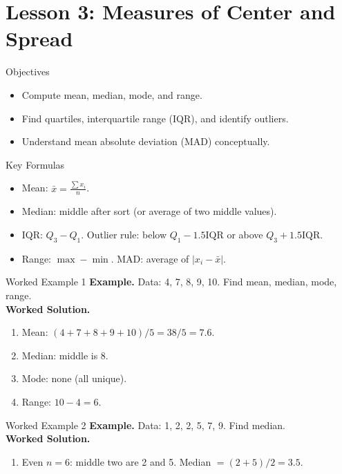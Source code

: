 \documentclass[aspectratio=169]{beamer}
\newcommand{\exampletitle}[1]{\vspace{0.25em}\textbf{Example.} #1\vspace{0.25em}}
\newcommand{\worked}{\textbf{Worked Solution.}}
\begin{document}
\section{Lesson 3: Measures of Center and Spread}

\begin{frame}{Objectives}
\begin{itemize}
  \item Compute mean, median, mode, and range.
  \item Find quartiles, interquartile range (IQR), and identify outliers.
  \item Understand mean absolute deviation (MAD) conceptually.
\end{itemize}
\end{frame}

\begin{frame}{Key Formulas}
\begin{itemize}
  \item Mean: $\displaystyle \bar{x}=\frac{\sum x_i}{n}$.
  \item Median: middle after sort (or average of two middle values).
  \item IQR: $Q_3-Q_1$. \quad Outlier rule: below $Q_1-1.5\text{IQR}$ or above $Q_3+1.5\text{IQR}$.
  \item Range: $\max - \min$. \quad MAD: average of $|x_i-\bar{x}|$.
\end{itemize}
\end{frame}

\begin{frame}{Worked Example 1}
\exampletitle{Data: 4, 7, 8, 9, 10. Find mean, median, mode, range.}\\[0.25em]
\worked
\begin{enumerate}
  \item Mean: $(4+7+8+9+10)/5=38/5=7.6$.
  \item Median: middle is 8.
  \item Mode: none (all unique).
  \item Range: $10-4=6$.
\end{enumerate}
\end{frame}

\begin{frame}{Worked Example 2}
\exampletitle{Data: 1, 2, 2, 5, 7, 9. Find median.}\\[0.25em]
\worked
\begin{enumerate}
  \item Even $n=6$: middle two are 2 and 5. Median $=(2+5)/2=3.5$.
\end{enumerate}
\end{frame}
\end{document}
